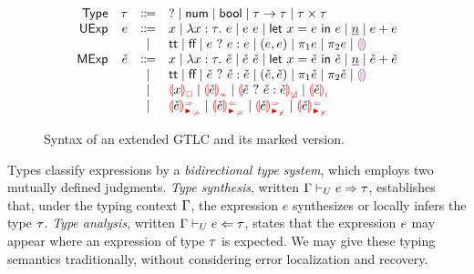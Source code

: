 \begin{figure}[htbp]
  \[\begin{array}{rrcl}
    \TMName  & \TMV  & \Coloneqq & \TUnknown \mid \TNum \mid \TBool \mid \TArrow{\TMV}{\TMV} \mid \TProd{\TMV}{\TMV} \\
    \EMName  & \EMV  & \Coloneqq & x \mid \ELam{x}{\TMV}{\EMV} \mid \EAp{\EMV}{\EMV} \mid \ELet{x}{\EMV}{\EMV}
                       \mid           \ENumMV \mid \EPlus{\EMV}{\EMV} \\
             &       & \mid         & \ETrue \mid \EFalse \mid \EIf{\EMV}{\EMV}{\EMV}
                       \mid           \EPair{\EMV}{\EMV}
                       \mid           \EProjL{\EMV} \mid \EProjR{\EMV}
                       \mid           \EEHole \\
    \ECMName & \ECMV & \Coloneqq & x \mid \ECLam{x}{\TMV}{\ECMV} \mid \ECAp{\ECMV}{\ECMV} \mid \ECLet{x}{\ECMV}{\ECMV}
                       \mid           \ECNumMV \mid \ECPlus{\ECMV}{\ECMV} \\
             &       & \mid         & \ECTrue \mid \ECFalse \mid \ECIf{\ECMV}{\ECMV}{\ECMV}
                       \mid           \ECPair{\ECMV}{\ECMV} \mid \ECProjL{\ECMV} \mid \ECProjR{\ECMV}
                       \mid           \ECEHole \\
             &       & \mid         & \ECUnbound{x} \mid \ECInconType{\ECMV} \mid \ECInconBr{\ECMV}{\ECMV}{\ECMV} \mid \ECInconAsc{\ECMV} \\
             &       & \mid         & \ECSynNonMatchedArrow{\ECMV} \mid \ECAnaNonMatchedArrow{\ECMV}
                       \mid           \ECSynNonMatchedProd{\ECMV} \mid \ECAnaNonMatchedProd{\ECMV}
  \end{array}\]
  \caption{Syntax of an extended GTLC and its marked version.}
  \label{fig:calculus-syntax}
\end{figure}

Types classify expressions by a \emph{bidirectional type system}, which employs two mutually defined
judgments. \emph{Type synthesis}, written $\Gamma \vdash_{U} e \Rightarrow \tau$, establishes that, under
the typing context $\Gamma$, the expression $e$ synthesizes or locally infers \cite{Localinf} the type
$\tau$. \emph{Type analysis}, written $\Gamma \vdash_{U} e \Leftarrow \tau$, states that the expression
$e$ may appear where an expression of type $\tau$ is expected. We may give these typing semantics
traditionally, without considering error localization and recovery.


